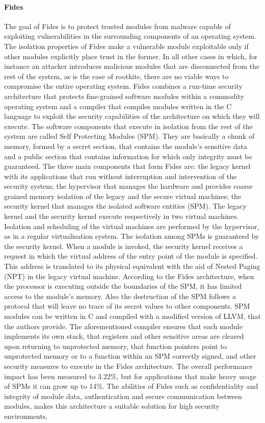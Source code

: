 \paragraph{Fides}
The goal of Fides \cite{fides} is to protect trusted modules from malware capable of exploiting vulnerabilities in the surrounding components of an operating system. The isolation properties of Fides make a vulnerable module exploitable only if other modules explicitly place trust in the former. In all other cases in which, for instance an attacker introduces malicious modules that are disconnected from the rest of the system, as is the case of rootkits, there are no viable ways to compromise the entire operating system. 
Fides combines a run-time security architecture that protects fine-grained software modules within a commodity operating system and a compiler that compiles modules written in the C language to exploit the security capabilities of the architecture on which they will execute.
The software components that execute in isolation from the rest of the system are called Self Protecting Modules (SPM). They are basically a chunk of memory, formed by a secret section, that contains the module's sensitive data and a public section that contains information for which only integrity must be guaranteed. 
The three main components that form Fides are: the legacy kernel with its applications that run without interruption and intervention of the security system; the hypervisor that manages the hardware and provides coarse grained memory isolation of the legacy and the secure virtual machines; the security kernel that manages the isolated software entities (SPM). The legacy kernel and the security kernel execute respectively in two virtual machines. Isolation and scheduling of the virtual machines are performed by the hypervisor, as in a regular virtualisation system.
The isolation among SPMs is guaranteed by the security kernel. When a module is invoked, the security kernel receives a request in which the virtual address of the entry point of the module is specified. This address is translated to its physical equivalent with the aid of Nested Paging (NPT) in the legacy virtual machine.
According to the Fides architecture, when the processor is executing outside the boundaries of the SPM, it has limited access to the module's memory. Also the destruction of the SPM follows a protocol that will leave no trace of its secret values to other components. 
SPM modules can be written in C and compiled with a modified version of LLVM, that the authors provide. The aforementioned compiler ensures that each module implements its own stack, that registers and other sensitive areas are cleared upon returning to unprotected memory, that function pointers point to unprotected memory or to a function within an SPM correctly signed, and other security measures to execute in the Fides architecture.
The overall performance impact has been measured to 3.22\%, but for applications that make heavy usage of SPMs it can grow up to 14\%.
The abilities of Fides such as confidentiality and integrity of module data, authentication and secure communication between modules, makes this architecture a suitable solution for high security environments.


